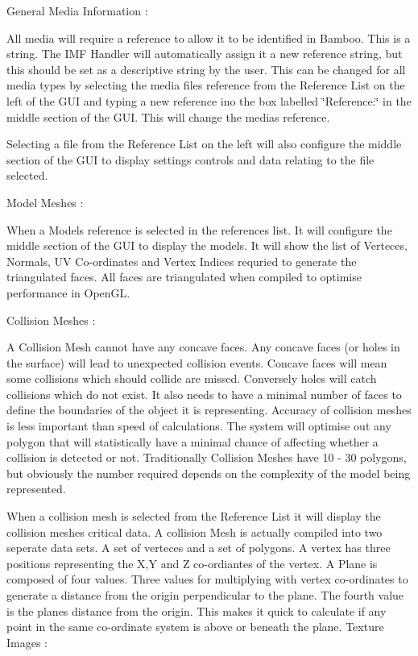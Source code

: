 General Media Information : \par
 All media will require a reference to allow it to be identified in Bamboo. This is a string. The IMF Handler will automatically assign it a new reference string, but this should be set as a descriptive string by the user. This can be changed for all media types by selecting the media files reference from the Reference List on the left of the GUI and typing a new reference ino the box labelled \char`\"{}Reference:\char`\"{} in the middle section of the GUI. This will change the medias reference. \par
 Selecting a file from the Reference List on the left will also configure the middle section of the GUI to display settings controls and data relating to the file selected.\par
 Model Meshes : \par
 When a Models reference is selected in the references list. It will configure the middle section of the GUI to display the models. It will show the list of Verteces, Normals, UV Co-\/ordinates and Vertex Indices requried to generate the triangulated faces. All faces are triangulated when compiled to optimise performance in OpenGL. \par
 Collision Meshes : \par
 A Collision Mesh cannot have any concave faces. Any concave faces (or holes in the surface) will lead to unexpected collision events. Concave faces will mean some collisions which should collide are missed. Conversely holes will catch collisions which do not exist. It also needs to have a minimal number of faces to define the boundaries of the object it is representing. Accuracy of collision meshes is less important than speed of calculations. The system will optimise out any polygon that will statistically have a minimal chance of affecting whether a collision is detected or not. Traditionally Collision Meshes have 10 -\/ 30 polygons, but obviously the number required depends on the complexity of the model being represented. \par
 When a collision mesh is selected from the Reference List it will display the collision meshes critical data. A collision Mesh is actually compiled into two seperate data sets. A set of verteces and a set of polygons. A vertex has three positions representing the X,Y and Z co-\/ordiantes of the vertex. A Plane is composed of four values. Three values for multiplying with vertex co-\/ordinates to generate a distance from the origin perpendicular to the plane. The fourth value is the planes distance from the origin. This makes it quick to calculate if any point in the same co-\/ordinate system is above or beneath the plane. Texture Images : \par
